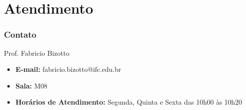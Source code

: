 \documentclass[
	10pt, %
	t, %
]{beamer}
\begin{document}
\section{Atendimento}

\begin{frame}
	\frametitle{Contato}

	\begin{block}{Prof. Fabricio Bizotto}
		\begin{itemize}
			\item \textbf{E-mail:} fabricio.bizotto@ifc.edu.br
			\item \textbf{Sala:} M08
			\item \textbf{Horários de Atendimento:} Segunda, Quinta e Sexta das 10h00 às 10h20
		\end{itemize}
	\end{block}

\end{frame}



\end{document}
